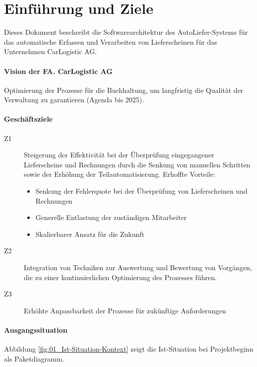 \section{Einführung und Ziele}\label{section-introduction-and-goals}

Dieses Dokument beschreibt die Softwarearchitektur des AutoLiefer-Systems für das automatische Erfassen und Verarbeiten von Lieferscheinen für das Unternehmen CarLogistic AG.

\paragraph{Vision der FA. CarLogistic AG}

Optimierung der Prozesse für die Buchhaltung, um langfristig die Qualität der Verwaltung zu garantieren (Agenda bis 2025).

\paragraph{Geschäftsziele}

\begin{description}
  \item [Z1] Steigerung der Effektivität bei der Überprüfung eingegangener Lieferscheine und Rechnungen durch die Senkung von manuellen Schritten sowie der Erhöhung der Teilautomatisierung. Erhoffte Vorteile:
  \begin{itemize}
    \item Senkung der Fehlerquote bei der Überprüfung von Lieferscheinen und Rechnungen
    \item Generelle Entlastung der zuständigen Mitarbeiter
    \item Skalierbarer Ansatz für die Zukunft
  \end{itemize}
  \item [Z2] Integration von Techniken zur Auswertung und Bewertung von Vorgängen, die zu einer kontinuierlichen Optimierung des Prozesses führen.
  \item [Z3] Erhöhte Anpassbarkeit der Prozesse für zukünftige Anforderungen
\end{description}

\paragraph{Ausgangssituation}

Abbildung \ref{fig:01_Ist-Situation-Kontext} zeigt die Ist-Situation bei Projektbeginn als Paketdiagramm.

